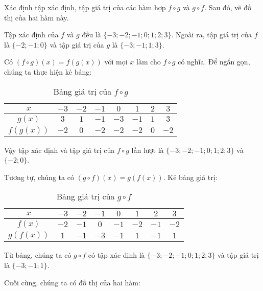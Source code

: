 Xác định tập xác định, tập giá trị của các hàm hợp $f\circ g$ và $g\circ f$. Sau đó, vẽ đồ thị của hai hàm này.

\solution

Tập xác định của $f$ và $g$ đều là $\{-3; -2; -1; 0; 1; 2; 3\}$. Ngoài ra, tập giá trị của $f$ là $\{-2;-1;0\}$ và tập giá trị của $g$ là $\{-3; -1; 1; 3\}$.

Có $\left(f\circ g\right)(x) = f\left(g(x)\right)$ với mọi $x$ làm cho $f\circ g$ có nghĩa. Để ngắn gọn, chúng ta thực hiện kẻ bảng:

\begin{table}[H]
   \centering
   \begin{tabular}{|c|c|c|c|c|c|c|c|}
      \hline
      $x$ & $-3$ & $-2$ & $-1$ & $0$ & $1$ & $2$ & $3$\\
      \hline
      $g(x)$ & $3$ & $1$ & $-1$ & $-3$ & $-1$ & $1$ & $3$\\
      \hline
      $f\left(g(x)\right)$ & $-2$ & $0$ & $-2$ & $-2$ & $-2$ & $0$ & $-2$\\
      \hline
   \end{tabular}
   \caption{Bảng giá trị của $f\circ g$}
\end{table}

Vậy tập xác định và tập giá trị của $f\circ g$ lần lượt là $\{-3; -2; -1; 0; 1; 2; 3\}$ và $\{-2; 0\}$.

Tương tự, chúng ta có $\left(g\circ f\right)(x) = g\left(f(x)\right)$. Kẻ bảng giá trị:

\begin{table}[H]
   \centering
   \begin{tabular}{|c|c|c|c|c|c|c|c|}
      \hline
      $x$ & $-3$ & $-2$ & $-1$ & $0$ & $1$ & $2$ & $3$\\
      \hline
      $f(x)$ & $-2$ & $-1$ & $0$ & $-1$ & $-2$ & $-1$ & $-2$\\
      \hline
      $g\left(f(x)\right)$ & $1$ & $-1$ & $-3$ & $-1$ & $1$ & $-1$ & $1$\\
      \hline
   \end{tabular}
   \caption{Bảng giá trị của $g\circ f$}
\end{table}

Từ bảng, chúng ta có $g\circ f$ có tập xác định là $\{-3; -2; -1; 0; 1; 2; 3\}$ và tập giá trị là $\{-3; -1; 1\}$.

Cuối cùng, chúng ta có đồ thị của hai hàm:

